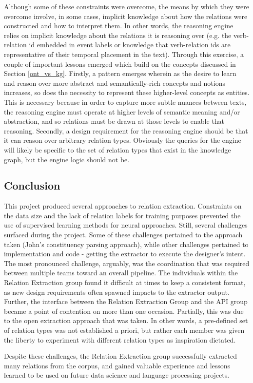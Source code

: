 \documentclass[11pt,letterpaper]{article}
\begin{document}
Although some of these constraints were overcome, the means by which they were overcome involve, in some cases, implicit knowledge about how the relations were constructed and how to interpret them.  In other words, the reasoning engine relies on implicit knowledge about the relations it is reasoning over (e.g. the verb-relation id embedded in event labels or knowledge that verb-relation ids are representative of their temporal placement in the text).  Through this exercise, a couple of important lessons emerged which build on the concepts discussed in Section \ref{ont_vs_kg}.  Firstly, a pattern emerges wherein as the desire to learn and reason over more abstract and semantically-rich concepts and notions increases, so does the necessity to represent these higher-level concepts as entities.  This is necessary because in order to capture more subtle nuances between texts, the reasoning engine must operate at higher levels of semantic meaning and/or abstraction, and so relations must be drawn at those levels to enable that reasoning.  Secondly, a design requirement for the reasoning engine should be that it can reason over arbitrary relation types.  Obviously the queries for the engine will likely be specific to the set of relation types that exist in the knowledge graph, but the engine logic should not be.


\subsection{Conclusion}

This project produced several approaches to relation extraction.  Constraints on the data size and the lack of relation labels for training purposes prevented the use of supervised learning methods for neural approaches.  Still, several challenges surfaced during the project.  Some of these challenges pertained to the approach taken (John's constituency parsing approach), while other challenges pertained to implementation and code - getting the extractor to execute the designer's intent.  The most pronounced challenge, arguably, was the coordination that was required between multiple teams toward an overall pipeline.  The individuals within the Relation Extraction group found it difficult at times to keep a consistent format, as new design requirements often spawned impacts to the extractor output.  Further, the interface between the Relation Extraction Group and the API group became a point of contention on more than one occasion.  Partially, this was due to the open extraction approach that was taken.  In other words, a pre-defined set of relation types was not established a priori, but rather each member was given the liberty to experiment with different relation types as inspiration dictated.

Despite these challenges, the Relation Extraction group successfully extracted many relations from the corpus, and gained valuable experience and lessons learned to be used on future data science and language processing projects.



\end{document}

